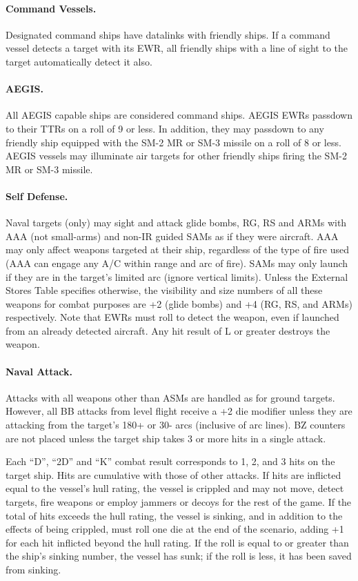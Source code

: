 \paragraph{Command Vessels.}

Designated command ships have data\-links with friendly ships. If a command vessel detects a target with its EWR, all friendly ships with a line of sight to the target automatically detect it also.

\paragraph{AEGIS.}

All AEGIS capable ships are considered command ships.   AEGIS EWRs passdown to their TTRs on a roll of 9 or less.  In addition, they may passdown to any friendly ship equipped with the SM-2 MR or SM-3 missile on a roll of 8 or less.  AEGIS vessels may illuminate air targets for other friendly ships firing the SM-2 MR or SM-3 missile.

\paragraph{Self Defense.}  Naval targets (only) may sight and attack glide bombs, RG, RS and ARMs with AAA (not small-arms) and non-IR guided SAMs as if they were aircraft.  AAA may only affect weapons targeted at their ship, regardless of the type of fire used (AAA can engage any A/C within range and arc of fire).  SAMs may only launch if they are in the target's limited arc (ignore vertical limits).  Unless the External Stores Table specifies otherwise, the visibility and size numbers of all these weapons for combat purposes are +2 (glide bombs) and +4 (RG, RS, and ARMs) respectively.  Note that EWRs must roll to detect the weapon, even if launched from an already detected aircraft.  Any hit result of L or greater destroys the weapon.


\paragraph{Naval Attack.} Attacks with all weapons other than ASMs are handled as for ground targets.  However, all BB attacks from level flight receive a +2 die modifier unless they are attacking from the target's 180+ or 30- arcs (inclusive of arc lines).  BZ counters are not placed unless the target ship takes 3 or more hits in a single attack.

Each “D”, “2D” and “K” combat result corresponds to 1, 2, and 3 hits on the target ship.  Hits are cumulative with those of other attacks.   If hits are inflicted equal to the vessel's hull rating, the vessel is crippled and may not move, detect targets, fire weapons or employ jammers or decoys for the rest of the game.  If the total of hits exceeds the hull rating, the vessel is sinking, and in addition to the effects of being crippled, must roll one die at the end of the scenario, adding +1 for each hit inflicted beyond the hull rating.  If the roll is equal to or greater than the ship's sinking number, the vessel has sunk; if the roll is less, it has been saved from sinking.

